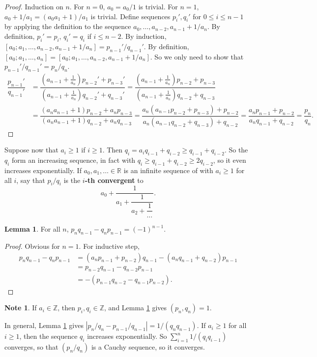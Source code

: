 \documentclass{article}
\newcommand{\Z}{\mathbb{Z}}
\newcommand{\R}{\mathbb{R}}
\newcommand{\rb}[1]{\left( #1 \right)}
\renewcommand{\sb}[1]{\left[ #1 \right]}
\newcommand{\abs}[1]{\left\lvert #1 \right\rvert}
\theoremstyle{definition}\newtheorem{definition}{Definition}
\theoremstyle{definition}\newtheorem{remark}[definition]{Remark}
\theoremstyle{definition}\newtheorem*{example}{Example}
\theoremstyle{definition}\newtheorem*{note}{Note}
\newtheorem{lemma}[definition]{Lemma}
\begin{document}
\begin{proof}
Induction on $ n $. For $ n = 0 $, $ a_0 = a_0 / 1 $ is trivial. For $ n = 1 $, $ a_0 + 1 / a_1 = \rb{a_0a_1 + 1} / a_1 $ is trivial. Define sequences $ p_i', q_i' $ for $ 0 \le i \le n - 1 $ by applying the definition to the sequence $ a_0, \dots, a_{n - 2}, a_{n - 1} + 1 / a_n $. By definition, $ p_i' = p_i $, $ q_i' = q_i $ if $ i \le n - 2 $. By induction, $ \sb{a_0; a_1, \dots, a_{n - 2}, a_{n - 1} + 1 / a_n} = p_{n - 1}' / q_{n - 1}' $. By definition, $ \sb{a_0; a_1, \dots, a_n} = \sb{a_0; a_1, \dots, a_{n - 2}, a_{n - 1} + 1 / a_n} $. So we only need to show that $ p_{n - 1}' / q_{n - 1}' = p_n / q_n $.
\begin{align*}
\dfrac{p_{n - 1}'}{q_{n - 1}'}
& = \dfrac{\rb{a_{n - 1} + \tfrac{1}{a_n}}p_{n - 2}' + p_{n - 3}'}{\rb{a_{n - 1} + \tfrac{1}{a_n}}q_{n - 2}' + q_{n - 3}'}
= \dfrac{\rb{a_{n - 1} + \tfrac{1}{a_n}}p_{n - 2} + p_{n - 3}}{\rb{a_{n - 1} + \tfrac{1}{a_n}}q_{n - 2} + q_{n - 3}} \\
& = \dfrac{\rb{a_na_{n - 1} + 1}p_{n - 2} + a_np_{n - 3}}{\rb{a_na_{n - 1} + 1}q_{n - 2} + a_nq_{n - 3}}
= \dfrac{a_n\rb{a_{n - 1}p_{n - 2} + p_{n - 3}} + p_{n - 2}}{a_n\rb{a_{n - 1}q_{n - 2} + q_{n - 3}} + q_{n - 2}}
= \dfrac{a_np_{n - 1} + p_{n - 2}}{a_nq_{n - 1} + q_{n - 2}}
= \dfrac{p_n}{q_n}.
\end{align*}
\end{proof}

Suppose now that $ a_i \ge 1 $ if $ i \ge 1 $. Then $ q_i = a_iq_{i - 1} + q_{i - 2} \ge q_{i - 1} + q_{i - 2} $. So the $ q_i $ form an increasing sequence, in fact with $ q_i \ge q_{i - 1} + q_{i - 2} \ge 2q_{i - 2} $, so it even increases exponentially. If $ a_0, a_1, \dots \in \R $ is an infinite sequence of with $ a_i \ge 1 $ for all $ i $, say that $ p_i / q_i $ is the \textbf{$ i $-th convergent} to
$$ a_0 + \dfrac{1}{a_1 + \dfrac{1}{a_2 + \dfrac{1}{\dots}}}. $$

\begin{lemma}
\label{lem:69}
For all $ n $, $ p_nq_{n - 1} - q_np_{n - 1} = \rb{-1}^{n - 1} $.
\end{lemma}

\begin{proof}
Obvious for $ n = 1 $. For inductive step,
\begin{align*}
p_nq_{n - 1} - q_np_{n - 1}
& = \rb{a_np_{n - 1} + p_{n - 2}}q_{n - 1} - \rb{a_nq_{n - 1} + q_{n - 2}}p_{n - 1} \\
& = p_{n - 2}q_{n - 1} - q_{n - 2}p_{n - 1} \\
& = -\rb{p_{n - 1}q_{n - 2} - q_{n - 1}p_{n - 2}}.
\end{align*}
\end{proof}

\begin{note}
If $ a_i \in \Z $, then $ p_i, q_i \in \Z $, and Lemma \ref{lem:69} gives $ \rb{p_n, q_n} = 1 $.
\end{note}

In general, Lemma \ref{lem:69} gives $ \abs{p_n / q_n - p_{n - 1} / q_{n - 1}} = 1 / \rb{q_nq_{n - 1}} $. If $ a_i \ge 1 $ for all $ i \ge 1 $, then the sequence $ q_i $ increases exponentially. So $ \sum_{i = 1}^n 1 / \rb{q_iq_{i - 1}} $ converges, so that $ \rb{p_n / q_n} $ is a Cauchy sequence, so it converges.
\end{document}
